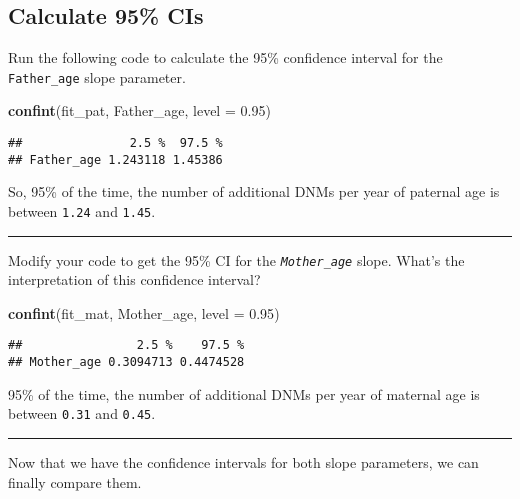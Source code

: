 \documentclass[
]{article}
\newenvironment{Shaded}{\begin{snugshade}}{\end{snugshade}}
\newcommand{\AttributeTok}[1]{\textcolor[rgb]{0.13,0.29,0.53}{#1}}
\newcommand{\FloatTok}[1]{\textcolor[rgb]{0.00,0.00,0.81}{#1}}
\newcommand{\FunctionTok}[1]{\textcolor[rgb]{0.13,0.29,0.53}{\textbf{#1}}}
\newcommand{\NormalTok}[1]{#1}
\newcommand{\StringTok}[1]{\textcolor[rgb]{0.31,0.60,0.02}{#1}}
\begin{document}
\subsection{Calculate 95\% CIs}\label{calculate-95-cis}

Run the following code to calculate the 95\% confidence interval for the
\texttt{Father\_age} slope parameter.

\begin{Shaded}
\begin{Highlighting}[]
\FunctionTok{confint}\NormalTok{(fit\_pat, }\StringTok{\textquotesingle{}Father\_age\textquotesingle{}}\NormalTok{, }\AttributeTok{level =} \FloatTok{0.95}\NormalTok{)}
\end{Highlighting}
\end{Shaded}

\begin{verbatim}
##               2.5 %  97.5 %
## Father_age 1.243118 1.45386
\end{verbatim}

So, 95\% of the time, the number of additional DNMs per year of paternal
age is between \texttt{1.24} and \texttt{1.45}.

\begin{center}\rule{0.5\linewidth}{0.5pt}\end{center}

Modify your code to get the 95\% CI for the \emph{\texttt{Mother\_age}}
slope. What's the interpretation of this confidence interval?

\begin{Shaded}
\begin{Highlighting}[]
\FunctionTok{confint}\NormalTok{(fit\_mat, }\StringTok{\textquotesingle{}Mother\_age\textquotesingle{}}\NormalTok{, }\AttributeTok{level =} \FloatTok{0.95}\NormalTok{)}
\end{Highlighting}
\end{Shaded}

\begin{verbatim}
##                2.5 %    97.5 %
## Mother_age 0.3094713 0.4474528
\end{verbatim}

95\% of the time, the number of additional DNMs per year of maternal age
is between \texttt{0.31} and \texttt{0.45}.

\begin{center}\rule{0.5\linewidth}{0.5pt}\end{center}

Now that we have the confidence intervals for both slope parameters, we
can finally compare them.
\end{document}
